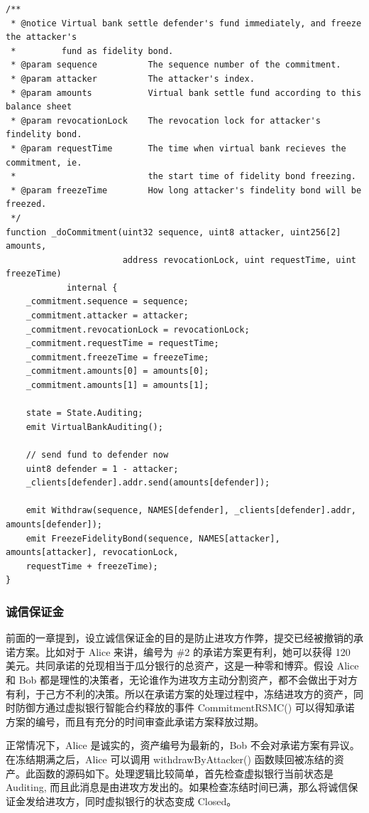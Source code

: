 \begin{appendices}
\begin{lstlisting}[caption={执行共同承诺}, label={lst:_doCommitment}]
/**
 * @notice Virtual bank settle defender's fund immediately, and freeze the attacker's 
 *         fund as fidelity bond.
 * @param sequence          The sequence number of the commitment.
 * @param attacker          The attacker's index.
 * @param amounts           Virtual bank settle fund according to this balance sheet
 * @param revocationLock    The revocation lock for attacker's findelity bond.
 * @param requestTime       The time when virtual bank recieves the commitment, ie. 
 *                          the start time of fidelity bond freezing.
 * @param freezeTime        How long attacker's findelity bond will be freezed.
 */
function _doCommitment(uint32 sequence, uint8 attacker, uint256[2] amounts, 
                       address revocationLock, uint requestTime, uint freezeTime) 
            internal {
    _commitment.sequence = sequence;
    _commitment.attacker = attacker;
    _commitment.revocationLock = revocationLock;
    _commitment.requestTime = requestTime;
    _commitment.freezeTime = freezeTime;
    _commitment.amounts[0] = amounts[0];
    _commitment.amounts[1] = amounts[1];
    
    state = State.Auditing;
    emit VirtualBankAuditing();
    
    // send fund to defender now
    uint8 defender = 1 - attacker;
    _clients[defender].addr.send(amounts[defender]);
    
    emit Withdraw(sequence, NAMES[defender], _clients[defender].addr, amounts[defender]);
    emit FreezeFidelityBond(sequence, NAMES[attacker], amounts[attacker], revocationLock, 
    requestTime + freezeTime);
}
\end{lstlisting}

\subsubsection{诚信保证金}
前面的一章提到，设立诚信保证金的目的是防止进攻方作弊，提交已经被撤销的承诺方案。比如对于 Alice 来讲，编号为 \#2 的承诺方案更有利，她可以获得 120 美元。共同承诺的兑现相当于瓜分银行的总资产，这是一种零和博弈。假设 Alice 和 Bob 都是理性的决策者，无论谁作为进攻方主动分割资产，都不会做出于对方有利，于己方不利的决策。所以在承诺方案的处理过程中，冻结进攻方的资产，同时防御方通过虚拟银行智能合约释放的事件 CommitmentRSMC() 可以得知承诺方案的编号，而且有充分的时间审查此承诺方案释放过期。

正常情况下，Alice 是诚实的，资产编号为最新的，Bob 不会对承诺方案有异议。在冻结期满之后，Alice 可以调用 withdrawByAttacker() 函数赎回被冻结的资产。此函数的源码如下。处理逻辑比较简单，首先检查虚拟银行当前状态是 Auditing, 而且此消息是由进攻方发出的。如果检查冻结时间已满，那么将诚信保证金发给进攻方，同时虚拟银行的状态变成 Closed。



\end{appendices}
